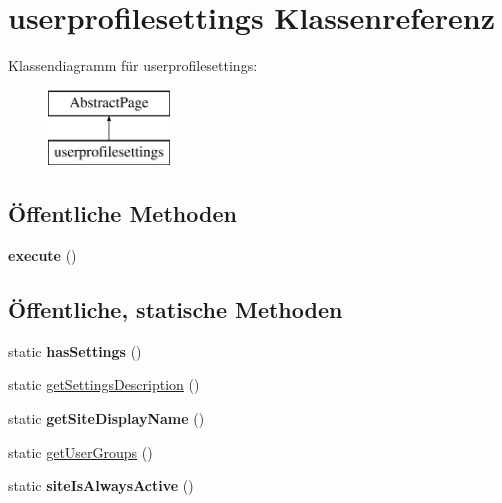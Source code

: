 \hypertarget{classuserprofilesettings}{}\section{userprofilesettings Klassenreferenz}
\label{classuserprofilesettings}
Klassendiagramm für userprofilesettings\+:\begin{figure}[H]
\begin{center}
\leavevmode
\includegraphics[height=2.000000cm]{classuserprofilesettings}
\end{center}
\end{figure}
\subsection*{Öffentliche Methoden}
\begin{DoxyCompactItemize}
\item 
\mbox{\label{classuserprofilesettings_a1a9666ecd335b219d9c46e36e5da6ee2}} 
{\bfseries execute} ()
\end{DoxyCompactItemize}
\subsection*{Öffentliche, statische Methoden}
\begin{DoxyCompactItemize}
\item 
\mbox{\label{classuserprofilesettings_a487fd8619b5c98159aa6ee35a9810e70}} 
static {\bfseries has\+Settings} ()
\item 
static \mbox{\hyperlink{classuserprofilesettings_a0a6d3f5e6d3d8f6d4e09b2b5ea849756}{get\+Settings\+Description}} ()
\item 
\mbox{\label{classuserprofilesettings_afc2f30ca0cd1e3b8d791a0b47ee02859}} 
static {\bfseries get\+Site\+Display\+Name} ()
\item 
static \mbox{\hyperlink{classuserprofilesettings_a008efc76482f2a8c7463725fb6010fac}{get\+User\+Groups}} ()
\item 
\mbox{\label{classuserprofilesettings_ae354f1449a92ff1c701f5a00af56d082}} 
static {\bfseries site\+Is\+Always\+Active} ()
\end{DoxyCompactItemize}
